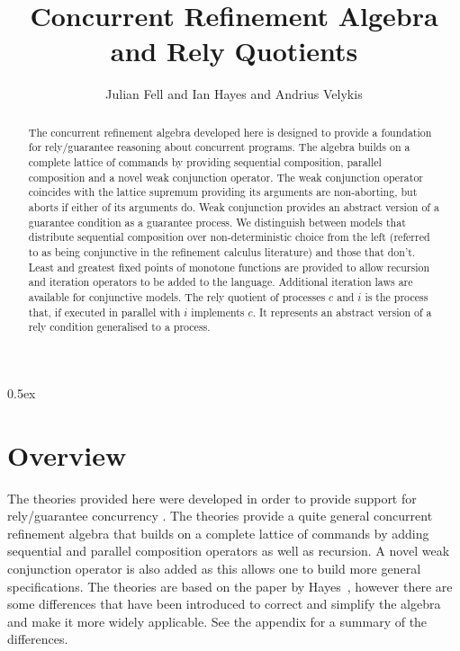 \documentclass[12pt,a4paper]{article}
\begin{document}
\title{Concurrent Refinement Algebra and Rely Quotients}
\author{Julian Fell and Ian Hayes and Andrius Velykis}
\maketitle

\begin{abstract}
The concurrent refinement algebra developed here is designed to provide a 
foundation for rely/guarantee reasoning about concurrent programs.
The algebra builds on a complete lattice of commands by providing
sequential composition, parallel composition and a novel weak conjunction operator.
The weak conjunction operator coincides with the lattice supremum 
providing its arguments are non-aborting, but aborts if either of its arguments do.
Weak conjunction provides an abstract version of a guarantee condition
as a guarantee process.
We distinguish between models that distribute sequential composition
over non-deterministic choice from the left 
(referred to as being conjunctive in the refinement calculus literature)
and those that don't.
Least and greatest fixed points of monotone functions are provided to
allow recursion and iteration operators to be added to the language.
Additional iteration laws are available for conjunctive models.
The rely quotient of processes $c$ and $i$ is the process that, 
if executed in parallel with $i$ implements $c$.
It represents an abstract version of a rely condition generalised to a process.
\end{abstract}

\newpage
\tableofcontents
\parindent 0pt\parskip 0.5ex

\newpage
\section{Overview}

The theories provided here were developed in order to provide support 
for rely/guarantee concurrency \cite{Jones81d,jon83a}.
The theories provide a quite general concurrent refinement algebra
that builds on a complete lattice of commands
by adding sequential and parallel composition operators
as well as recursion.
A novel weak conjunction operator is also added as this allows one to build
more general specifications.
The theories are based on the paper by Hayes~\cite{AFfGRGRACP},
however there are some differences that have been introduced to correct and simplify
the algebra and make it more widely applicable.
See the appendix for a summary of the differences.
\end{document}
